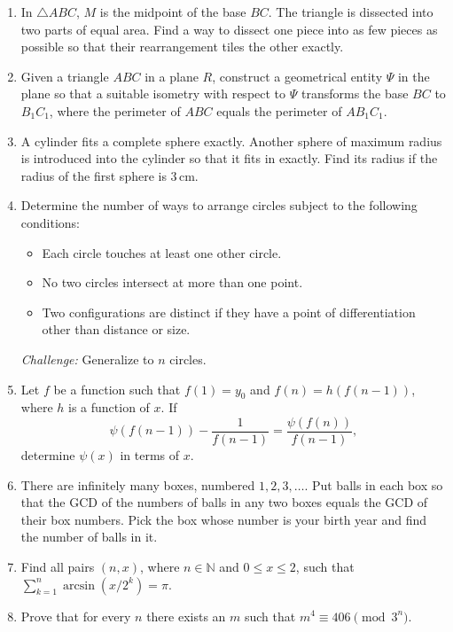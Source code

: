 \documentclass[11pt,a4paper]{article}
\begin{document}
\begin{enumerate}[label=\textbf{\arabic*.},itemsep=.75em]
\item In $\triangle ABC$, $M$ is the midpoint of the base $BC$. The triangle is
dissected into two parts of equal area. Find a way to dissect one piece into as few
pieces as possible so that their rearrangement tiles the other exactly.

\item Given a triangle $ABC$ in a plane $R$, construct a geometrical entity $\Psi$
in the plane so that a suitable isometry with respect to $\Psi$ transforms the base
$BC$ to $B_1C_1$, where the perimeter of $ABC$ equals the perimeter of $AB_1C_1$.

\item A cylinder fits a complete sphere exactly. Another sphere of maximum radius
is introduced into the cylinder so that it fits in exactly. Find its radius if the
radius of the first sphere is $3\,\mathrm{cm}$.

\item Determine the number of ways to arrange circles subject to the following conditions:
\begin{itemize}
\item Each circle touches at least one other circle.
\item No two circles intersect at more than one point.
\item Two configurations are distinct if they have a point of differentiation
other than distance or size.
\end{itemize}
\emph{Challenge:} Generalize to $n$ circles.

\item Let $f$ be a function such that $f(1)=y_0$ and $f(n)=h(f(n-1))$, where $h$
is a function of $x$. If
\[
\psi(f(n-1))-\frac1{f(n-1)}=\frac{\psi(f(n))}{f(n-1)},
\]
determine $\psi(x)$ in terms of $x$.

\item There are infinitely many boxes, numbered $1,2,3,\ldots$. Put balls in each
box so that the GCD of the numbers of balls in any two boxes equals the GCD of their
box numbers. Pick the box whose number is your birth year and find the number of balls in it.

\item Find all pairs $(n,x)$, where $n\in\mathbb N$ and $0\leq x\leq2$, such that
$\sum_{k=1}^{n}\arcsin(x/2^k)=\pi$.

\item Prove that for every $n$ there exists an $m$ such that $m^4\equiv406\pmod{3^n}$.


\end{enumerate}
\end{document}
